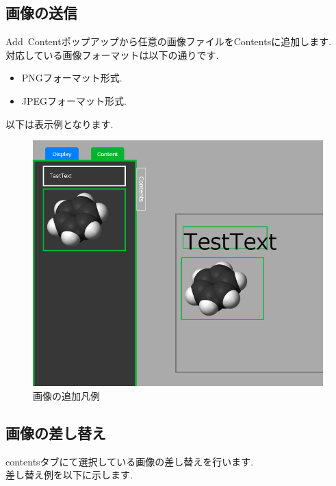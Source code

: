 \documentclass[a4paper,10pt,oneside]{jsbook}
\begin{document}
\newpage





\subsection{画像の送信}
Add\ Contentポップアップから任意の画像ファイルをContentsに追加します.\\
対応している画像フォーマットは以下の通りです.\\

\begin{itemize}
\item PNGフォーマット形式.
\item JPEGフォーマット形式.
\end{itemize}

以下は表示例となります.\\
\begin{figure}[htbp]
	\begin{center}
		\includegraphics[width=11.5cm]{image/AddContent_Picture_View.PNG}
	\end{center}
	\caption{画像の追加凡例}
	\label{fig:addimage}
\end{figure}



\newpage

\subsection{画像の差し替え}
contentsタブにて選択している画像の差し替えを行います.\\
差し替え例を以下に示します.\\
\end{document}
